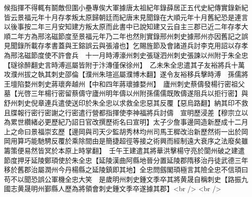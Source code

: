 候指揮不得輒有鬬敵但圍小壘專俟大軍據唐太祖紀年錄薛居正五代史紀傳實錄新紀皆云景福元年十月存孝叛太原歸朝廷而紀唐末見聞錄在大順元年十月舊紀恐是連言以後事按二年三月安知建方叛太原而此書中已說知建又云自主三郡已近二年存孝大順二年方為邢洺磁節度至景福元年乃二年也然則實錄邢州刺史據邢州亦因舊記之誤見聞錄所載存孝書蓋與王鎔誤云與張濬也】乞賜旌節及會諸道兵討李克用詔以存孝為邢洺磁節度使不許會兵　十一月時溥濠州刺史張璲泗州刺史張諫以州附于朱全忠【璲徐醉翻史言時溥巡屬皆附于汴漙僅保徐州】　乙未朱全忠遣其子友裕將兵十萬攻濮州拔之執其刺史邵倫【濮州朱瑄巡屬濮博木翻】遂令友裕移兵擊時溥　孫儒將王壇陷婺州刺史蔣瓌奔越州【中和四年蔣瓌據婺州】　廬州刺史蔡儔發楊行密祖父墓【光啓三年楊行密留蔡儔守廬州明年儔以州附孫儒儒既敗儔遂阻兵以拒行密】與舒州刺史倪章連兵遣使送印於朱全忠以求救全忠惡其反覆【惡烏路翻】納其印不救且牒報行密行密謝之行密遣行營都指揮使李神福將兵討儔　宣明歷浸差【穆宗立以為累世纘緒必更歷紀乃詔日官改撰歷術名曰宣明】太子少詹事邊岡造新歷成十二月上之命曰景福崇玄歷【邊岡與司天少監胡秀林均州司馬王穉改治新歷然術一出於岡岡用算巧能馳騁反覆於乘除間由是簡捷超徑等接之術興而經制遠大衰序之法廢矣雖籌策便易然皆冥於本原上時掌翻】　壬午王建遣其將華洪擊楊守亮於閬州破之建遣節度押牙延陵鄭頊使於朱全忠【延陵漢曲阿縣地晉分置延陵郡隋移治丹徒武德三年移於舊郡治屬潤州今丹楊縣之延陵鎮即其地】全忠問劔閣頊極言其險全忠不信頊曰苟不以聞恐誤公軍機全忠大笑　是歲明州刺史鍾文季卒其將黄晟自稱刺史【路振九國志黄晟明州鄞縣人歷為將領會刺史鍾文季卒遂據其郡】<br />
<br />

